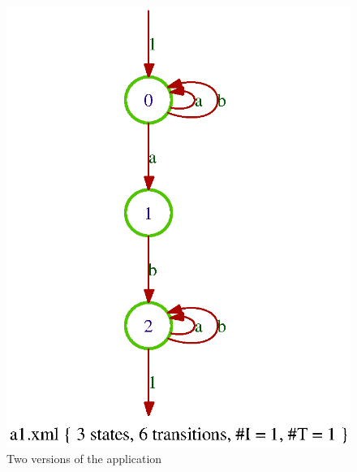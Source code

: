 \begin{figure}[ht]
\includegraphics[scale=0.5]{figures/a1-gv.ps}
\caption{Two versions of the  application}
\label{fig:gra-viz}%
\end{figure}



\endinput
